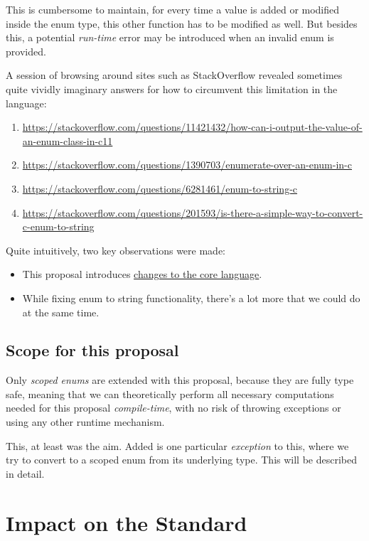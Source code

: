 \documentclass[
  format=manuscript,
  screen=true,
  review=false,
  nonacm=true,
  timestamp=true,
  balance=false]{acmart}
\begin{document}
\noindent
This is cumbersome to maintain, for every time a value is added or modified inside
the enum type, this other function has to be modified as well. But besides this,
a potential \textit{run-time} error may be introduced when an invalid enum is
provided.

A session of browsing around sites such as StackOverflow revealed sometimes quite
vividly imaginary answers for how to circumvent this limitation in the language:

\begin{enumerate}
\item \url{https://stackoverflow.com/questions/11421432/how-can-i-output-the-value-of-an-enum-class-in-c11}
\item \url{https://stackoverflow.com/questions/1390703/enumerate-over-an-enum-in-c}
\item \url{https://stackoverflow.com/questions/6281461/enum-to-string-c}
\item \url{https://stackoverflow.com/questions/201593/is-there-a-simple-way-to-convert-c-enum-to-string}
\end{enumerate}

\noindent
Quite intuitively, two key observations were made:

\begin{itemize}
\item This proposal introduces \underline{changes to the core language}.
\item While fixing enum to string functionality, there's a lot more that we could do at the same time.
\end{itemize}

\subsection{Scope for this proposal}

Only \textit{scoped enums} are extended with this proposal, because they are fully
type safe, meaning that we can theoretically perform all necessary computations needed
for this proposal \textit{compile-time}, with no risk of throwing exceptions or using
any other runtime mechanism.

This, at least was the aim. Added is one particular \textit{exception} to this,
where we try to convert to a scoped enum from its underlying type. This will be
described in detail.


\section{Impact on the Standard}
\end{document}
